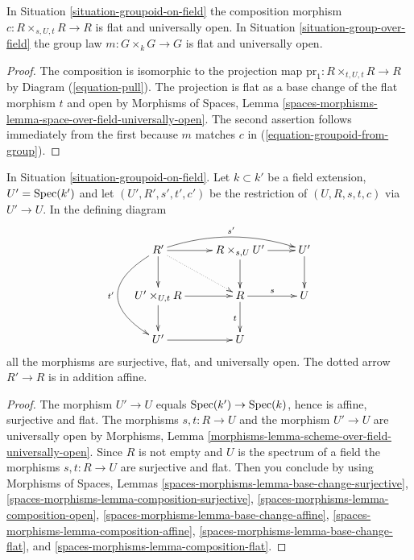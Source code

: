 \begin{lemma}
\label{lemma-groupoid-on-field-open-multiplication}
In
Situation \ref{situation-groupoid-on-field}
the composition morphism $c : R \times_{s, U, t} R \to R$ is flat and
universally open.
In
Situation \ref{situation-group-over-field}
the group law $m : G \times_k G \to G$ is flat and
universally open.
\end{lemma}

\begin{proof}
The composition is isomorphic to the projection map
$\text{pr}_1 : R \times_{t, U, t} R \to R$ by
Diagram (\ref{equation-pull}).
The projection is flat as a base change of the flat morphism $t$
and open by
Morphisms of Spaces,
Lemma \ref{spaces-morphisms-lemma-space-over-field-universally-open}.
The second assertion follows immediately from the first because
$m$ matches $c$ in (\ref{equation-groupoid-from-group}).
\end{proof}

\begin{lemma}
\label{lemma-restrict-groupoid-on-field}
In
Situation \ref{situation-groupoid-on-field}.
Let $k \subset k'$ be a field extension, $U' = \mathop{\rm Spec}(k')$
and let $(U', R', s', t', c')$ be the restriction of
$(U, R, s, t, c)$ via $U' \to U$. In the defining diagram
$$
\xymatrix{
R' \ar[d] \ar[r] \ar@/_3pc/[dd]_{t'} \ar@/^1pc/[rr]^{s'} \ar@{..>}[rd] &
R \times_{s, U} U' \ar[r] \ar[d] &
U' \ar[d] \\
U' \times_{U, t} R \ar[d] \ar[r] &
R \ar[r]^s \ar[d]_t &
U \\
U' \ar[r] &
U
}
$$
all the morphisms are surjective, flat, and universally open.
The dotted arrow $R' \to R$ is in addition affine.
\end{lemma}

\begin{proof}
The morphism $U' \to U$ equals $\mathop{\rm Spec}(k') \to \mathop{\rm Spec}(k)$,
hence is affine, surjective and flat. The morphisms $s, t : R \to U$
and the morphism $U' \to U$ are universally open by
Morphisms, Lemma \ref{morphisms-lemma-scheme-over-field-universally-open}.
Since $R$ is not empty and $U$ is the spectrum of a field the morphisms
$s, t : R \to U$ are surjective and flat. Then you conclude by using
Morphisms of Spaces, Lemmas
\ref{spaces-morphisms-lemma-base-change-surjective},
\ref{spaces-morphisms-lemma-composition-surjective},
\ref{spaces-morphisms-lemma-composition-open},
\ref{spaces-morphisms-lemma-base-change-affine},
\ref{spaces-morphisms-lemma-composition-affine},
\ref{spaces-morphisms-lemma-base-change-flat}, and
\ref{spaces-morphisms-lemma-composition-flat}.
\end{proof}


